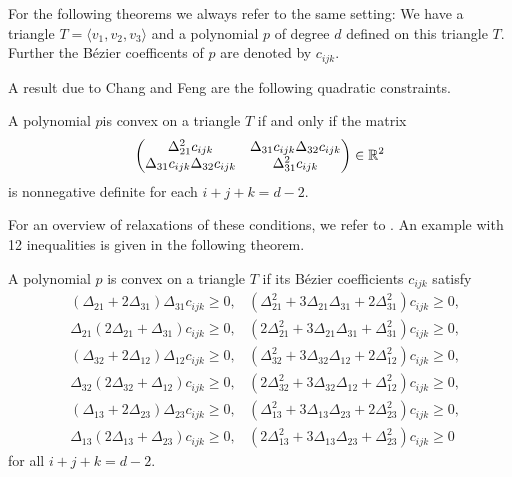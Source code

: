  For the following theorems  we always refer to the same setting: We have a triangle $T=\langle v_1, v_2,v_3 \rangle$ and a polynomial $p$ of degree $d$ defined on this triangle $T$. Further the B\'ezier coefficents of $p$ are denoted by $c_{ijk}$.
 
A result due to Chang and Feng \cite{CD1984} are the following quadratic constraints.
\begin{theorem} \label{thm: convex cond quadr}
	A polynomial $p$is convex on a triangle $T$ if and only if the matrix
	\[
		\begin{pmatrix}
			\Delta_{21}^2 c_{ijk} & \Delta_{31} c_{ijk} \Delta_{32} c_{ijk}\\
			\Delta_{31}c_{ijk} \Delta_{32} c_{ijk} & \Delta_{31}^2 c_{ijk} 
		\end{pmatrix} \in \mathbb{R}^2
	\]
	is nonnegative definite for each $i + j + k =d-2 $.
\end{theorem}
For an overview of relaxations of these conditions, we refer to \cite{SS2010}. An example with 12 inequalities is given in the following theorem.
\begin{theorem}
\label{thm: convex cond on triangle}
	A polynomial $p$ is convex on a triangle $T$ if its B\'ezier coefficients $c_{ijk}$ satisfy
	\begin{align*}
		&(\Delta_{21} + 2\Delta_{31}) \Delta_{31} c_{ijk} \geq 0, 
		&   (\Delta_{21}^2 + 3\Delta_{21} \Delta_{31} + 2 \Delta_{31}^2) c_{ijk} \geq 0, \\
		& \Delta_{21}(2\Delta_{21} + \Delta_{31})  c_{ijk} \geq 0, 
		&   (2\Delta_{21}^2 + 3\Delta_{21} \Delta_{31} +  \Delta_{31}^2) c_{ijk} \geq 0, \\  
		&(\Delta_{32} + 2\Delta_{12}) \Delta_{12} c_{ijk} \geq 0, 
		&   (\Delta_{32}^2 + 3\Delta_{32} \Delta_{12} + 2 \Delta_{12}^2) c_{ijk} \geq 0, \\
		&\Delta_{32} (2\Delta_{32} + \Delta_{12}) c_{ijk} \geq 0, 
		&   (2\Delta_{32}^2 + 3\Delta_{32} \Delta_{12} +  \Delta_{12}^2) c_{ijk} \geq 0, \\  
		&(\Delta_{13} + 2\Delta_{23}) \Delta_{23} c_{ijk} \geq 0, 
		&   (\Delta_{13}^2 + 3\Delta_{13} \Delta_{23} + 2 \Delta_{23}^2) c_{ijk} \geq 0, \\
		& \Delta_{13}(2\Delta_{13} + \Delta_{23})  c_{ijk} \geq 0, 
		&   (2\Delta_{13}^2 + 3\Delta_{13} \Delta_{23} +  \Delta_{23}^2) c_{ijk} \geq 0   
	\end{align*}
	for all $i + j + k = d-2 $.
\end{theorem}
